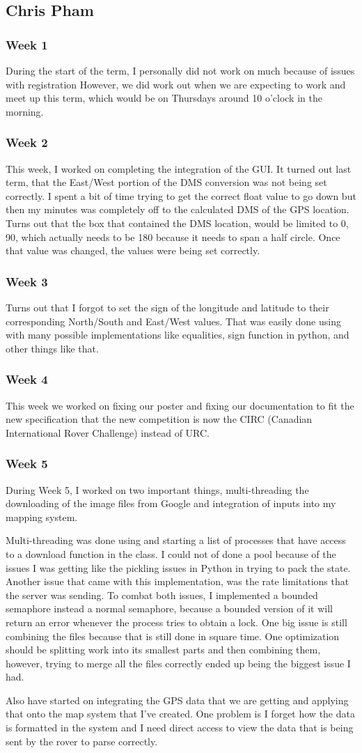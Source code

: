 \subsection{Chris Pham}
\subsubsection{Week 1}
During the start of the term, I personally did not work on much because of issues with registration 
However, we did work out when we are expecting to work and meet up this term, which would be on Thursdays around 10 o'clock in the morning.
\subsubsection{Week 2}
This week, I worked on completing the integration of the GUI.
It turned out last term, that the East/West portion of the DMS conversion was not being set correctly.
I spent a bit of time trying to get the correct float value to go down but then my minutes was completely off to the calculated DMS of the GPS location.
Turns out that the box that contained the DMS location, would be limited to 0, 90, which actually needs to be 180 because it needs to span a half circle.
Once that value was changed, the values were being set correctly.
\subsubsection{Week 3}
Turns out that I forgot to set the sign of the longitude and latitude to their corresponding North/South and East/West values.
That was easily done using with many possible implementations like equalities, sign function in python, and other things like that.
\subsubsection{Week 4}
This week we worked on fixing our poster and fixing our documentation to fit the new specification that the new competition is now the CIRC (Canadian International Rover Challenge) instead of URC.
\subsubsection{Week 5}
During Week 5, I worked on two important things, multi-threading the downloading of the image files from Google and integration of inputs into my mapping system.

\noindent Multi-threading was done using and starting a list of processes that have access to a download function in the class.
I could not of done a pool because of the issues I was getting like the pickling issues in Python in trying to pack the state.
Another issue that came with this implementation, was the rate limitations that the server was sending.
To combat both issues, I implemented a bounded semaphore instead a normal semaphore, because a bounded version of it will return an error whenever the process tries to obtain a lock.
One big issue is still combining the files because that is still done in square time.
One optimization should be splitting work into its smallest parts and then combining them, however, trying to merge all the files correctly ended up being the biggest issue I had.

\noindent Also have started on integrating the GPS data that we are getting and applying that onto the map system that I've created.
One problem is I forget how the data is formatted in the system and I need direct access to view the data that is being sent by the rover to parse correctly.